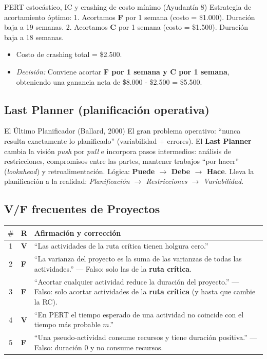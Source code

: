 \begin{ejercicio}{PERT estocástico, IC y crashing de costo mínimo (Ayudantía 8)}
Estrategia de acortamiento óptimo:
1.  Acortamos \textbf{F} por 1 semana (costo = \$1.000). Duración baja a 19 semanas.
2.  Acortamos \textbf{C} por 1 semana (costo = \$1.500). Duración baja a 18 semanas.
\begin{itemize}
  \item Costo de crashing total = \$2.500.
  \item \textit{Decisión:} Conviene acortar \textbf{F por 1 semana y C por 1 semana}, obteniendo una ganancia neta de \$8.000 - \$2.500 = \$5.500.
\end{itemize}
\end{ejercicio}

\subsection{Last Planner (planificación operativa)}

\begin{definicion}{El Último Planificador (Ballard, 2000)}
El gran problema operativo: ``nunca resulta exactamente lo planificado'' (variabilidad + errores). El \textbf{Last Planner} cambia la visión \textit{push} por \textit{pull} e incorpora pasos intermedios: análisis de restricciones, compromisos entre las partes, mantener trabajos ``por hacer'' (\textit{lookahead}) y retroalimentación. Lógica: \textbf{Puede $\to$ Debe $\to$ Hace}. Lleva la planificación a la realidad: \textit{Planificación $\to$ Restricciones $\to$ Variabilidad}.
\end{definicion}

\subsection{V/F frecuentes de Proyectos}

\begin{center}
\small
\begin{tabular}{@{}clp{10.5cm}@{}}
  \toprule
  $\#$ & R & Afirmación y corrección \\
  \midrule
  1 & \textbf{V} & ``Las actividades de la ruta crítica tienen holgura cero.'' \\
  2 & \textbf{F} & ``La varianza del proyecto es la suma de las varianzas de todas las actividades.'' --- Falso: solo las de la \textbf{ruta crítica}. \\
  3 & \textbf{F} & ``Acortar cualquier actividad reduce la duración del proyecto.'' --- Falso: solo acortar actividades de la \textbf{ruta crítica} (y hasta que cambie la RC). \\
  4 & \textbf{V} & ``En PERT el tiempo esperado de una actividad no coincide con el tiempo más probable $m$.'' \\
  5 & \textbf{F} & ``Una pseudo-actividad consume recursos y tiene duración positiva.'' --- Falso: duración 0 y no consume recursos. \\
  \bottomrule
\end{tabular}
\end{center}



